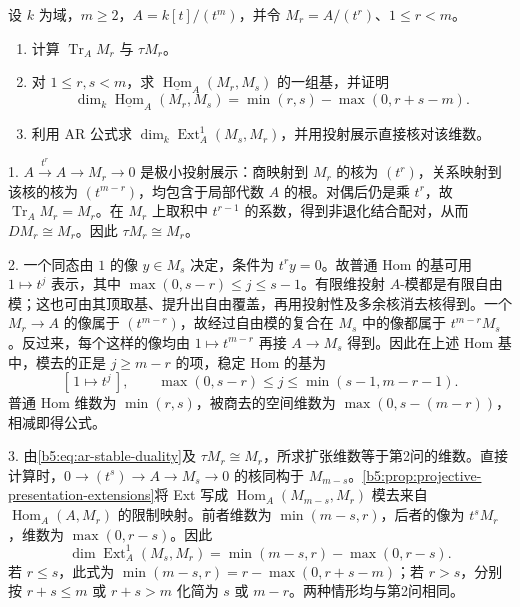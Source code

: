 \begin{optionalexercise}\label{b5:ex:10-truncated-stable-hom}
	设 \(k\) 为域，\(m\ge2\)，\(A=k[t]/(t^m)\)，并令 \(M_r=A/(t^r)\)、\(1\le r<m\)。
	\begin{enumerate}
		\item 计算 \(\operatorname{Tr}_A M_r\) 与 \(\tau M_r\)。
		\item 对 \(1\le r,s<m\)，求 \(\underline{\operatorname{Hom}}_A(M_r,M_s)\) 的一组基，并证明
		\[
			\dim_k\underline{\operatorname{Hom}}_A(M_r,M_s)
			=\min(r,s)-\max(0,r+s-m).
		\]
		\item 利用 AR 公式求 \(\dim_k\operatorname{Ext}_A^1(M_s,M_r)\)，并用投射展示直接核对该维数。
	\end{enumerate}
\end{optionalexercise}
\begin{solution}
	1. \(A\xrightarrow{t^r}A\to M_r\to0\) 是极小投射展示：商映射到 \(M_r\) 的核为 \((t^r)\)，关系映射到该核的核为 \((t^{m-r})\)，均包含于局部代数 \(A\) 的根。对偶后仍是乘 \(t^r\)，故 \(\operatorname{Tr}_A M_r=M_r\)。在 \(M_r\) 上取积中 \(t^{r-1}\) 的系数，得到非退化结合配对，从而 \(DM_r\cong M_r\)。因此 \(\tau M_r\cong M_r\)。

	2. 一个同态由 \(1\) 的像 \(y\in M_s\) 决定，条件为 \(t^ry=0\)。故普通 Hom 的基可用 \(1\mapsto t^j\) 表示，其中 \(\max(0,s-r)\le j\le s-1\)。有限维投射 \(A\)-模都是有限自由模；这也可由其顶取基、提升出自由覆盖，再用投射性及多余核消去核得到。一个 \(M_r\to A\) 的像属于 \((t^{m-r})\)，故经过自由模的复合在 \(M_s\) 中的像都属于 \(t^{m-r}M_s\)。反过来，每个这样的像均由 \(1\mapsto t^{m-r}\) 再接 \(A\to M_s\) 得到。因此在上述 Hom 基中，模去的正是 \(j\ge m-r\) 的项，稳定 Hom 的基为
	\[
		[\,1\mapsto t^j\,],\qquad
		\max(0,s-r)\le j\le\min(s-1,m-r-1).
	\]
	普通 Hom 维数为 \(\min(r,s)\)，被商去的空间维数为 \(\max(0,s-(m-r))\)，相减即得公式。

	3. 由\eqref{b5:eq:ar-stable-duality}及 \(\tau M_r\cong M_r\)，所求扩张维数等于第2问的维数。直接计算时，\(0\to(t^s)\to A\to M_s\to0\) 的核同构于 \(M_{m-s}\)。\cref{b5:prop:projective-presentation-extensions}将 Ext 写成 \(\operatorname{Hom}_A(M_{m-s},M_r)\) 模去来自 \(\operatorname{Hom}_A(A,M_r)\) 的限制映射。前者维数为 \(\min(m-s,r)\)，后者的像为 \(t^sM_r\)，维数为 \(\max(0,r-s)\)。因此
	\[
		\dim\operatorname{Ext}_A^1(M_s,M_r)
		=\min(m-s,r)-\max(0,r-s).
	\]
	若 \(r\le s\)，此式为 \(\min(m-s,r)=r-\max(0,r+s-m)\)；若 \(r>s\)，分别按 \(r+s\le m\) 或 \(r+s>m\) 化简为 \(s\) 或 \(m-r\)。两种情形均与第2问相同。
\end{solution}

